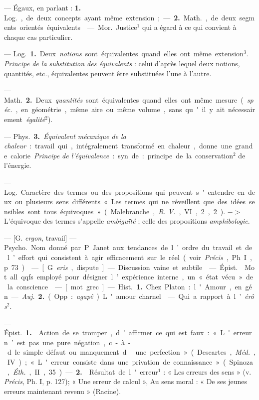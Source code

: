\begin{itemize}[leftmargin=1cm, label=, itemsep=1pt]
 — Égaux, en parlant :
{\bf 1.} \si{Log.}, de deux concepts ayant
même extension ; — {\bf 2.} \si{Math.}, de
deux segments orientés équivalents.

 — \si{Mor.} Justice$^1$ qui a égard
à ce qui convient à chaque cas particulier.

 — \si{Log.} {\bf 1.} Deux {\it notions}
sont équivalentes quand elles ont
même extension$^3$. {\it Principe de la
substitution des équivalents} : celui
d’après lequel deux notions, quantités, etc., équivalentes peuvent être
substituées l’une à l’autre.

— \si{Math.} {\bf 2.} Deux {\it quantités} sont
équivalentes quand elles ont même
mesure ({\it spéc.}, en géométrie, même
aire ou même volume, sans qu'il y
ait nécessairement {\it égalité}$^2$).

— \si{Phys.} {\bf 3.} {\it Équivalent mécanique de la
chaleur} : travail qui, intégralement transformé en chaleur, donne
une grande calorie. {\it Principe de
l’équivalence} : syn. de : principe de
la conservation$^2$ de l’énergie.

 — \si{Log.} Caractère des
termes ou des propositions qui peuvent s'entendre en deux ou plusieurs
sens différents « Les termes qui ne
réveillent que des idées sensibles
sont tous équivoques » (Malebranche, {\it R. V.}, VI, 2, 2). $->$
L'équivoque des termes s'appelle
{\it ambiguïté} ; celle des propositions
{\it amphibologie}.

 — [G. {\it ergon},
travail] — \si{Psycho.} Nom donné par
P. Janet aux tendances de l’ordre
du travail et de l’effort qui consistent à agir efficacement sur le réel
(voir  {\it Précis}, Ph. I, p. 73).

 — [G. {\it eris}, dispute] — Discussion vaine et subtile.

 — \si{Épist.}  Mot all. qqfs
employé pour désigner l’expérience
interne, un « état vécu » de la conscience.

 — [mot grec] — \si{Hist.} {\bf 1.} Chez
Platon : l'Amour, en gén. — {\it Auj.}
 {\bf 2.} (Opp. : {\it agapê}). L'amour charnel.

 — Qui a rapport à l’{\it érôs}$^2$.

 — \si{Épist.} {\bf 1.}  Action de se
tromper, d'affirmer ce qui est faux :
« L'erreur n’est pas une pure négation, c.-à-d. le simple défaut ou
manquement d'une perfection »
(Descartes, {\it Méd.}, IV); « L'erreur
consiste dans une privation de connaissance » (Spinoza, {\it Éth.}, II, 35).
— {\bf 2.}  Résultat de l'erreur$^1$ : « Les erreurs
des sens » (v.  {\it Précis}, Ph. I, p. 127); « Une erreur de calcul »,
Au sens moral : « De ses jeunes erreurs maintenant revenu » (Racine).


\end{itemize}

